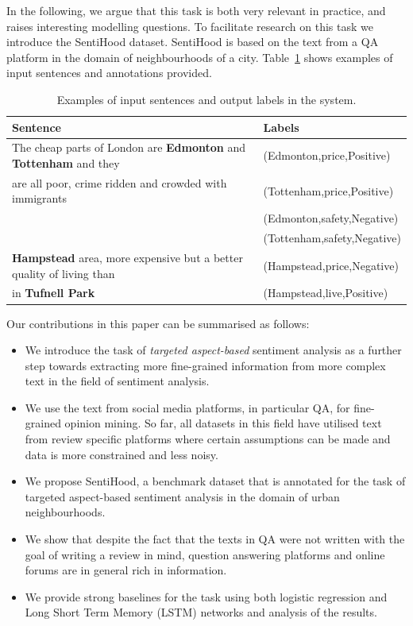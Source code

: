\documentclass[11pt]{article}
\begin{document}
    In the following, we argue that this task is both very relevant in practice, and raises interesting modelling questions. To facilitate research on this task we introduce the SentiHood dataset. SentiHood is based on the text from a QA platform in the domain of neighbourhoods of a city. Table~\ref{tab:example_task} shows examples of input sentences and annotations provided.
    \begin{table}[ht]
        \centering
        \begin{tabular}{|l|l|}
        \hline
            \textbf{Sentence}                                                                    & \textbf{Labels}    \\
            \hline
            The cheap parts of London are \textbf{Edmonton} and \textbf{Tottenham} and they  & (Edmonton,price,Positive) \\
                    are all poor, crime ridden and crowded with immigrants      &  (Tottenham,price,Positive) \\
                        &  (Edmonton,safety,Negative) \\
                        & (Tottenham,safety,Negative)\\
            \hline
            \textbf{Hampstead} area, more expensive but a better quality of living than                    & (Hampstead,price,Negative)\\
             in \textbf{Tufnell Park}                                                          & (Hampstead,live,Positive)\\
            \hline
        \end{tabular}
        \caption{Examples of input sentences and output labels in the system.}
        \label{tab:example_task}
    \end{table}  
    
    Our contributions in this paper can be summarised as follows:
    \begin{itemize}
        \item We introduce the task of \emph{targeted aspect-based} sentiment analysis as a further step towards extracting more fine-grained information from more complex text in the field of sentiment analysis.
        \item We use the text from social media platforms, in particular QA, for fine-grained opinion mining. So far, all datasets in this field have utilised text from review specific platforms where certain assumptions can be made and data is more constrained and less noisy.
        \item We propose SentiHood, a benchmark dataset that is annotated for the task of targeted aspect-based sentiment analysis in the domain of urban neighbourhoods.
        \item We show that despite the fact that the texts in QA were not written with the goal of writing a review in mind, question answering platforms and online forums are in general rich in information.
        \item We provide strong baselines for the task using both logistic regression and Long Short Term Memory (LSTM) networks and analysis of the results.
    \end{itemize}
\end{document}

